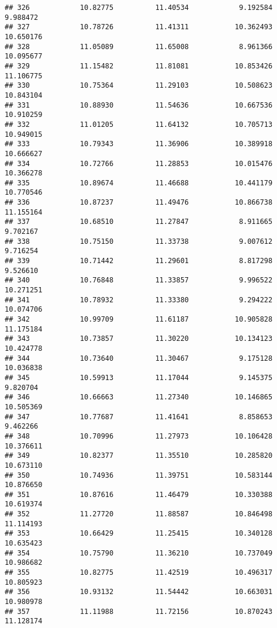 \documentclass[
]{article}
\begin{document}
\begin{verbatim}
## 326            10.82775          11.40534            9.192584          9.988472
## 327            10.78726          11.41311           10.362493         10.650176
## 328            11.05089          11.65008            8.961366         10.095677
## 329            11.15482          11.81081           10.853426         11.106775
## 330            10.75364          11.29103           10.508623         10.843104
## 331            10.88930          11.54636           10.667536         10.910259
## 332            11.01205          11.64132           10.705713         10.949015
## 333            10.79343          11.36906           10.389918         10.666627
## 334            10.72766          11.28853           10.015476         10.366278
## 335            10.89674          11.46688           10.441179         10.770546
## 336            10.87237          11.49476           10.866738         11.155164
## 337            10.68510          11.27847            8.911665          9.702167
## 338            10.75150          11.33738            9.007612          9.716254
## 339            10.71442          11.29601            8.817298          9.526610
## 340            10.76848          11.33857            9.996522         10.271251
## 341            10.78932          11.33380            9.294222         10.074706
## 342            10.99709          11.61187           10.905828         11.175184
## 343            10.73857          11.30220           10.134123         10.424778
## 344            10.73640          11.30467            9.175128         10.036838
## 345            10.59913          11.17044            9.145375          9.820704
## 346            10.66663          11.27340           10.146865         10.505369
## 347            10.77687          11.41641            8.858653          9.462266
## 348            10.70996          11.27973           10.106428         10.376611
## 349            10.82377          11.35510           10.285820         10.673110
## 350            10.74936          11.39751           10.583144         10.876650
## 351            10.87616          11.46479           10.330388         10.619374
## 352            11.27720          11.88587           10.846498         11.114193
## 353            10.66429          11.25415           10.340128         10.635423
## 354            10.75790          11.36210           10.737049         10.986682
## 355            10.82775          11.42519           10.496317         10.805923
## 356            10.93132          11.54442           10.663031         10.980978
## 357            11.11988          11.72156           10.870243         11.128174

\end{verbatim}
\end{document}

